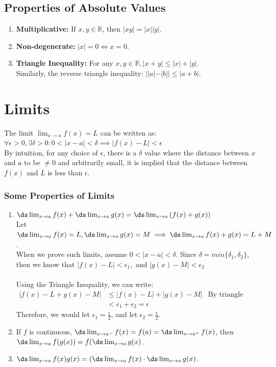 \documentclass{article}
\begin{document}
\subsection{Properties of Absolute Values}
\begin{enumerate}
    \item \textbf{Multiplicative: }If $x, y \in \mathbb{R}$, then $|xy| = |x||y|$.
    \item \textbf{Non-degenerate: }$|x| = 0 \iff x = 0$.
    \item \textbf{Triangle Inequality: }For any $x, y \in \mathbb{R}, |x + y| \leq |x| + |y|$.\\
    Similarly, the reverse triangle inequality: $||a| - |b|| \leq |a + b|$.
\end{enumerate}
\section{Limits}
The limit $\lim_{x \to a} f(x) = L$ can be written as: $\forall \epsilon > 0, \exists \delta > 0: 0 < | x - a | < \delta \implies | f(x) - L | < \epsilon$\\
By intuition, for any choice of $\epsilon$, there is a $\delta$ value where the distance between $x$ and $a$ to be $\neq 0$ and arbitrarily small, it is implied that the distance between $f(x)$ and $L$ is less than $\epsilon$.

\subsubsection{Some Properties of Limits}
\begin{enumerate}
    \item $\ds \lim_{x\to a} f(x) + \ds \lim_{x \to a} g(x) = \ds \lim_{x \to a} \left( f(x) + g(x) \right)$\\
    Let $\ds \lim_{x \to a} f(x) = L, \ds \lim_{x \to a} g(x) = M \implies \ds \lim_{x \to a} f(x) + g(x) = L + M$.\\
    When we prove such limits, assume $0 < |x -a| < \delta$. Since $\delta = min\{\delta_1, \delta_2 \}$, then we know that $|f(x) - L| < \epsilon_1,$ and $|g(x) - M| < \epsilon_2$\\
    \\
    Using the Triangle Inequality, we can write:
    \begin{align*}
        |f(x) - L + g(x)  - M| & \leq |f(x) - L| + |g(x) - M| & \text{By triangle inequality.}\\
        & < \epsilon_1 + \epsilon_2 = \epsilon
    \end{align*}
    Therefore, we would let $\epsilon_1 = \frac{\epsilon}{2}$, and let $\epsilon_2 = \frac{\epsilon}{2}$.
    \item If $f$ is continuous, $\ds \lim_{x \to a^-} f(x) = f(a) = \ds \lim_{x \to a^+} f(x)$, then $\ds \lim_{x\to a} f(g(x)) = f (\ds \lim_{x \to a} g(x)$.
    \item $\ds \lim_{x \to a} f(x) g(x) = (\ds \lim_{x \to a} f(x) \cdot \ds \lim_{x \to a} g(x)$.
\end{enumerate}
\end{document}
